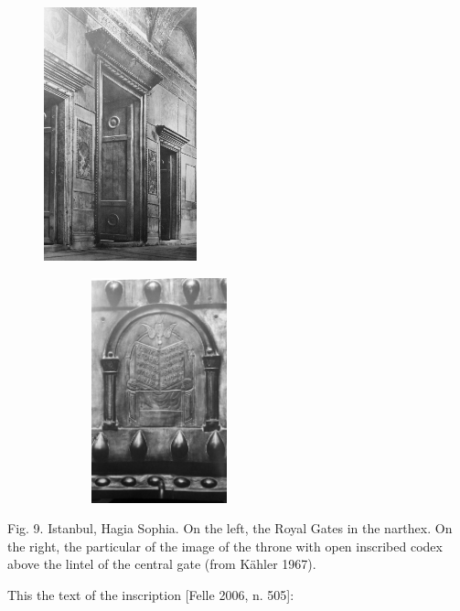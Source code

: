 \documentclass[amsthm,ebook]{saparticle}
\begin{document}
\begin{figure}
\centering
\includegraphics[width=4.419cm,height=7.329cm]{FelleVisualFeaturesofinscriptionsEAGLE2016FullPaper-img012.jpg}
\end{figure}
\begin{figure}
\centering
\includegraphics[width=6.655cm,height=6.509cm]{FelleVisualFeaturesofinscriptionsEAGLE2016FullPaper-img013.jpg}
\end{figure}
\begin{figure}
\centering
\begin{minipage}{0.688cm}

\bigskip
\end{minipage}
\end{figure}

\bigskip


\bigskip

Fig. 9. Istanbul, Hagia Sophia. On the left, the Royal Gates in the narthex. On the right, the particular of the image
of the throne with open inscribed codex above the lintel of the central gate (from Kähler 1967).


\bigskip

This the text of the inscription [Felle 2006, n. 505]: 
\end{document}
